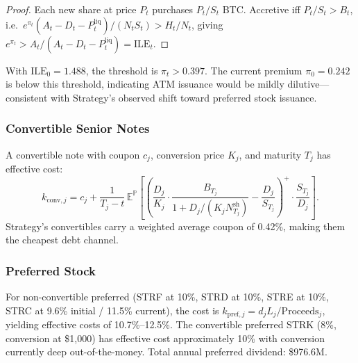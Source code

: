 \begin{proof}
  Each new share at price $P_t$ purchases $P_t/S_t$ BTC.  Accretive iff
  $P_t/S_t > B_t$, i.e.\ $e^{\pi_t}(A_t - D_t - P_t^{\mathrm{liq}})/(N_tS_t) > H_t/N_t$,
  giving $e^{\pi_t} > A_t/(A_t - D_t - P_t^{\mathrm{liq}}) = \mathrm{ILE}_t$.
\end{proof}

With $\mathrm{ILE}_0 = 1.488$, the threshold is $\pi_t > 0.397$.  The
current premium $\pi_0 = 0.242$ is below this threshold, indicating ATM
issuance would be mildly dilutive---consistent with Strategy's observed
shift toward preferred stock issuance.

\subsubsection{Convertible Senior Notes}

A convertible note with coupon $c_j$, conversion price $K_j$, and maturity
$T_j$ has effective cost:
\begin{equation}
  \label{eq:conv_cost}
  k_{\mathrm{conv},j} = c_j + \frac{1}{T_j - t}\,
  \mathbb{E}^{\mathbb{P}}\!\left[
    \left(\frac{D_j}{K_j}\cdot\frac{B_{T_j}}{1 + D_j/(K_jN_{T_j}^{\mathrm{sh}})}
    - \frac{D_j}{S_{T_j}}\right)^{\!+}
    \cdot \frac{S_{T_j}}{D_j}
  \right].
\end{equation}
Strategy's convertibles carry a weighted average coupon of 0.42\%, making
them the cheapest debt channel.

\subsubsection{Preferred Stock}

For non-convertible preferred (STRF at 10\%, STRD at 10\%, STRE at 10\%,
STRC at 9.6\% initial / 11.5\% current), the cost is
$k_{\mathrm{pref},j} = d_j L_j / \text{Proceeds}_j$, yielding effective
costs of 10.7\%--12.5\%.  The convertible preferred STRK (8\%, conversion at
\$1,000) has effective cost approximately 10\% with conversion currently deep
out-of-the-money.  Total annual preferred dividend: \$976.6M.

